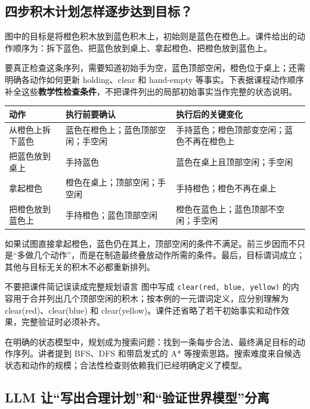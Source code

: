 \documentclass[11pt,a4paper]{article}
\begin{document}
\subsection{四步积木计划怎样逐步达到目标？}

图中的目标是将橙色积木放到蓝色积木上，初始则是蓝色在橙色上。课件给出的动作顺序为：拆下蓝色、把蓝色放到桌上、拿起橙色、把橙色放到蓝色上。

要真正检查这条序列，需要知道初始手为空，蓝色顶部空闲，橙色位于桌上；还需明确各动作如何更新 holding、clear 和 hand-empty 等事实。下表据课程动作顺序补全这些\textbf{教学性检查条件}，不把课件列出的局部初始事实当作完整的状态说明。

\begin{center}
\small
\begin{tabularx}{\textwidth}{L{.20\textwidth}XX}
\toprule
动作 & 执行前要确认 & 执行后的关键变化 \\
\midrule
从橙色上拆下蓝色 & 蓝色在橙色上；蓝色顶部空闲；手空闲 & 手持蓝色；橙色顶部变空闲；蓝色不再在橙色上 \\
把蓝色放到桌上 & 手持蓝色 & 蓝色在桌上且顶部空闲；手空闲 \\
拿起橙色 & 橙色在桌上；顶部空闲；手空闲 & 手持橙色；橙色不再在桌上 \\
把橙色放到蓝色上 & 手持橙色；蓝色顶部空闲 & 橙色在蓝色上；蓝色顶部不空闲；手空闲 \\
\bottomrule
\end{tabularx}
\end{center}

如果试图直接拿起橙色，蓝色仍在其上，顶部空闲的条件不满足。前三步因而不只是“多做几个动作”，而是在制造最终叠放动作所需的条件。最后，目标谓词成立；其他与目标无关的积木不必都重新排列。

\begin{warningbox}{不要把课件简记误读成完整规划语言}
图中写成 \texttt{clear(red, blue, yellow)} 的内容用于合并列出几个顶部空闲的积木；按本例的一元谓词定义，应分别理解为 clear(red)、clear(blue) 和 clear(yellow)。课件还省略了若干初始事实和动作效果，完整验证时必须补齐。
\end{warningbox}

在明确的状态模型中，规划成为搜索问题：找到一条每步合法、最终满足目标的动作序列。讲者提到 BFS、DFS 和带启发式的 A* 等搜索思路。搜索难度来自候选状态和动作的规模；合法性检查则依赖我们已经明确定义了模型。

\subsection{LLM 让“写出合理计划”和“验证世界模型”分离}
\end{document}
